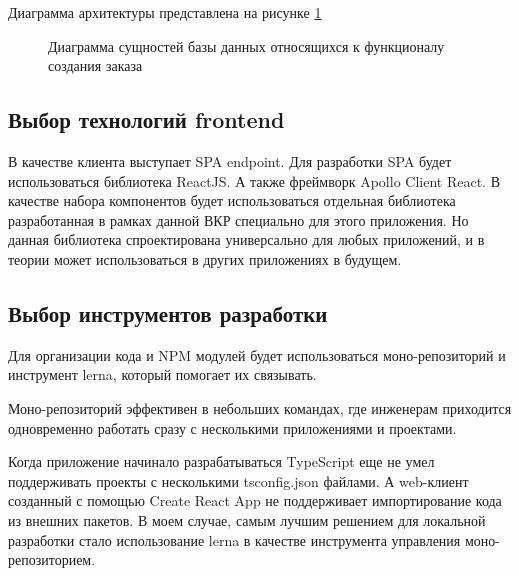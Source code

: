 \documentclass[a4paper,article,14pt]{extarticle}
\begin{document}
Диаграмма архитектуры представлена на рисунке \ref{arch}

\begin{figure}[ht]
\begin{center}
\caption{\label{arch} Диаграмма сущностей базы данных относящихся к функционалу создания заказа}
\end {center}
\end {figure}

\subsection{Выбор технологий frontend}

В качестве клиента выступает SPA endpoint. Для разработки SPA будет использоваться библиотека ReactJS.
А также фреймворк Apollo Client React. 
В качестве набора компонентов будет использоваться отдельная библиотека разработанная в рамках данной ВКР специально для
этого приложения. Но данная библиотека спроектирована универсально для любых приложений, 
и в теории может использоваться в других приложениях в будущем.

\subsection{Выбор инструментов разработки}

Для организации кода и NPM модулей будет использоваться моно-репозиторий и инструмент lerna,
который помогает их связывать.

Моно-репозиторий эффективен в небольших командах, где инженерам приходится одновременно работать 
сразу с несколькими приложениями и проектами.

Когда приложение начинало разрабатываться TypeScript еще не умел поддерживать проекты с несколькими tsconfig.json файлами.
А web-клиент созданный с помощью Create React App не поддерживает импортирование кода из внешних пакетов.
В моем случае, самым лучшим решением для локальной разработки стало 
использование lerna в качестве инструмента управления моно-репозиторием.
\end{document}

